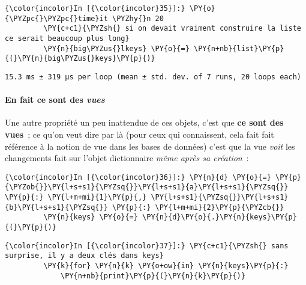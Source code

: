     \begin{Verbatim}[commandchars=\\\{\},frame=single,framerule=0.3mm,rulecolor=\color{cellframecolor}]
{\color{incolor}In [{\color{incolor}35}]:} \PY{o}{\PYZpc{}\PYZpc{}time}it \PYZhy{}n 20
         \PY{c+c1}{\PYZsh{} si on devait vraiment construire la liste ce serait beaucoup plus long}
         \PY{n}{big\PYZus{}lkeys} \PY{o}{=} \PY{n+nb}{list}\PY{p}{(}\PY{n}{big\PYZus{}keys}\PY{p}{)}
\end{Verbatim}


    \begin{Verbatim}[commandchars=\\\{\},frame=single,framerule=0.3mm,rulecolor=\color{cellframecolor}]
15.3 ms ± 319 µs per loop (mean ± std. dev. of 7 runs, 20 loops each)
\end{Verbatim}

    \hypertarget{en-fait-ce-sont-des-vues}{%
\paragraph{\texorpdfstring{En fait ce sont des
\emph{vues}}{En fait ce sont des vues}}\label{en-fait-ce-sont-des-vues}}

    Une autre propriété un peu inattendue de ces objets, c'est que
\textbf{ce sont des vues}~; ce qu'on veut dire par là (pour ceux qui
connaissent, cela fait fait référence à la notion de vue dans les bases
de données) c'est que la vue \emph{voit} les changements fait sur
l'objet dictionnaire \emph{même après sa création}~:

    \begin{Verbatim}[commandchars=\\\{\},frame=single,framerule=0.3mm,rulecolor=\color{cellframecolor}]
{\color{incolor}In [{\color{incolor}36}]:} \PY{n}{d} \PY{o}{=} \PY{p}{\PYZob{}}\PY{l+s+s1}{\PYZsq{}}\PY{l+s+s1}{a}\PY{l+s+s1}{\PYZsq{}} \PY{p}{:} \PY{l+m+mi}{1}\PY{p}{,} \PY{l+s+s1}{\PYZsq{}}\PY{l+s+s1}{b}\PY{l+s+s1}{\PYZsq{}} \PY{p}{:} \PY{l+m+mi}{2}\PY{p}{\PYZcb{}}
         \PY{n}{keys} \PY{o}{=} \PY{n}{d}\PY{o}{.}\PY{n}{keys}\PY{p}{(}\PY{p}{)}
\end{Verbatim}


    \begin{Verbatim}[commandchars=\\\{\},frame=single,framerule=0.3mm,rulecolor=\color{cellframecolor}]
{\color{incolor}In [{\color{incolor}37}]:} \PY{c+c1}{\PYZsh{} sans surprise, il y a deux clés dans keys}
         \PY{k}{for} \PY{n}{k} \PY{o+ow}{in} \PY{n}{keys}\PY{p}{:}
             \PY{n+nb}{print}\PY{p}{(}\PY{n}{k}\PY{p}{)}
\end{Verbatim}


